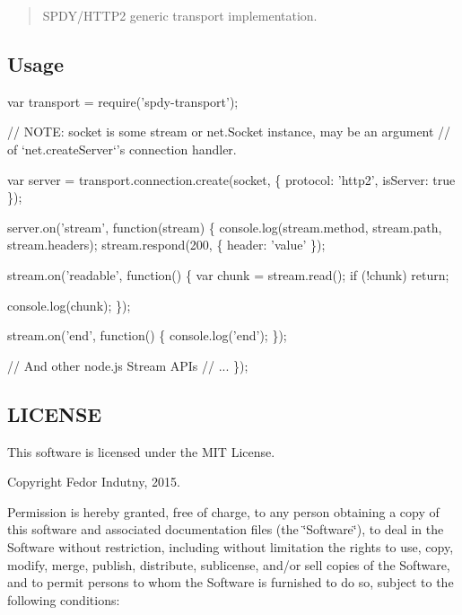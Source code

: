 \href{http://travis-ci.org/spdy-http2/spdy-transport}{\tt } \href{http://badge.fury.io/js/spdy-transport}{\tt } \href{https://david-dm.org/spdy-http2/spdy-transport}{\tt } \href{http://standardjs.com/}{\tt } \href{https://waffle.io/spdy-http2/node-spdy}{\tt }

\begin{quote}
S\+P\+D\+Y/\+H\+T\+T\+P2 generic transport implementation. \end{quote}


\subsection*{Usage}


\begin{DoxyCode}
var transport = require('spdy-transport');

// NOTE: socket is some stream or net.Socket instance, may be an argument
// of `net.createServer`'s connection handler.

var server = transport.connection.create(socket, \{
  protocol: 'http2',
  isServer: true
\});

server.on('stream', function(stream) \{
  console.log(stream.method, stream.path, stream.headers);
  stream.respond(200, \{
    header: 'value'
  \});

  stream.on('readable', function() \{
    var chunk = stream.read();
    if (!chunk)
      return;

    console.log(chunk);
  \});

  stream.on('end', function() \{
    console.log('end');
  \});

  // And other node.js Stream APIs
  // ...
\});
\end{DoxyCode}


\subsection*{L\+I\+C\+E\+N\+SE}

This software is licensed under the M\+IT License.

Copyright Fedor Indutny, 2015.

Permission is hereby granted, free of charge, to any person obtaining a copy of this software and associated documentation files (the \char`\"{}\+Software\char`\"{}), to deal in the Software without restriction, including without limitation the rights to use, copy, modify, merge, publish, distribute, sublicense, and/or sell copies of the Software, and to permit persons to whom the Software is furnished to do so, subject to the following conditions\+:

